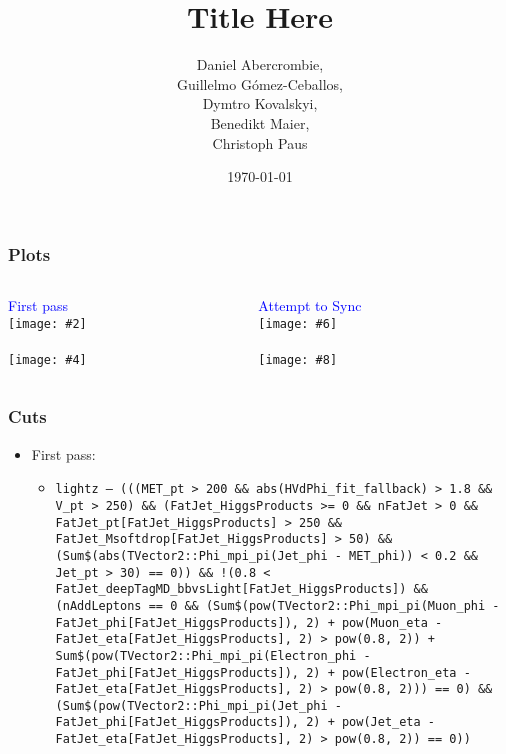 \documentclass{beamer}
\author[D. Abercrombie]{
  Daniel Abercrombie, \\
  Guillelmo G\'omez-Ceballos, \\
  Dymtro Kovalskyi, \\
  Benedikt Maier, \\
  Christoph Paus
}
\title{\bf \sffamily Title Here}
\date{\today}
\newcommand{\fourfigs}[8]{
  \begin{columns}
    \begin{column}{0.3\linewidth}
      \centering
      \textcolor{blue}{#1} \\
      \texttt{[image: \#2]} \\
      \textcolor{blue}{#3} \\
      \texttt{[image: \#4]}
    \end{column}
    \begin{column}{0.3\linewidth}
      \centering
      \textcolor{blue}{#5} \\
      \texttt{[image: \#6]} \\
      \textcolor{blue}{#7} \\
      \texttt{[image: \#8]}
    \end{column}
  \end{columns}
}
\begin{document}
\begin{frame}
  \frametitle{Plots}

  \fourfigs{First pass}
           {200208_zvv_2017/lightz_FatJet_eta[FatJet_HiggsProducts].pdf}
           {}
           {200208_zvv_2017/heavyz_FatJet_eta[FatJet_HiggsProducts].pdf}
           {Attempt to Sync}
           {200210_test/lightz_FatJet_eta.pdf}
           {}
           {200210_test/heavyz_FatJet_eta.pdf}

\end{frame}

\begin{frame}
  \frametitle{Cuts}

  \begin{itemize}
  \item First pass:
    \begin{itemize}
    \item \texttt{\scriptsize lightz -- (((MET\_pt > 200 \&\& abs(HVdPhi\_fit\_fallback) > 1.8 \&\& V\_pt > 250) \&\& (FatJet\_HiggsProducts >= 0 \&\& nFatJet > 0 \&\& FatJet\_pt[FatJet\_HiggsProducts] > 250 \&\& FatJet\_Msoftdrop[FatJet\_HiggsProducts] > 50) \&\& (Sum\$(abs(TVector2::Phi\_mpi\_pi(Jet\_phi - MET\_phi)) < 0.2 \&\& Jet\_pt > 30) == 0)) \&\& !(0.8 < FatJet\_deepTagMD\_bbvsLight[FatJet\_HiggsProducts]) \&\& (nAddLeptons == 0 \&\& (Sum\$(pow(TVector2::Phi\_mpi\_pi(Muon\_phi - FatJet\_phi[FatJet\_HiggsProducts]), 2) + pow(Muon\_eta - FatJet\_eta[FatJet\_HiggsProducts], 2) > pow(0.8, 2)) + Sum\$(pow(TVector2::Phi\_mpi\_pi(Electron\_phi - FatJet\_phi[FatJet\_HiggsProducts]), 2) + pow(Electron\_eta - FatJet\_eta[FatJet\_HiggsProducts], 2) > pow(0.8, 2))) == 0) \&\& (Sum\$(pow(TVector2::Phi\_mpi\_pi(Jet\_phi - FatJet\_phi[FatJet\_HiggsProducts]), 2) + pow(Jet\_eta - FatJet\_eta[FatJet\_HiggsProducts], 2) > pow(0.8, 2)) == 0))}
    \end{itemize}
  \end{itemize}

\end{frame}
    
\end{document}
